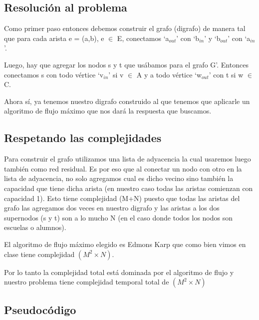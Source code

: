 \subsection{Resolución al problema}

Como primer paso entonces debemos construir el grafo (digrafo) de manera tal que para cada arista e = (a,b), e $\in$ E, conectamos `a$_{out}$' con `b$_{in}$' y `b$_{out}$' con `a$_{in}$'.

Luego, hay que agregar los nodos s y t que usábamos para el grafo G'. Entonces conectamos s con todo vértice `v$_{in}$' si v $\in$ A y a todo vértice `w$_{out}$' con t si w $\in$ C.

Ahora sí, ya tenemos nuestro digrafo construido al que tenemos que aplicarle un algoritmo de flujo máximo que nos dará la respuesta que buscamos.

\subsection{Respetando las complejidades}

Para construir el grafo utilizamos una lista de adyacencia la cual usaremos luego también como red residual. Es por eso que al conectar un nodo con otro en la lista de adyacencia, no solo agregamos cual es dicho vecino sino también la capacidad que tiene dicha arista (en nuestro caso todas las aristas comienzan con capacidad 1). Esto tiene complejidad \bigo(M+N) puesto que todas las aristas del grafo las agregamos dos veces en nuestro digrafo y las aristas a los dos supernodos (s y t) son a lo mucho N (en el caso donde todos los nodos son escuelas o alumnos). 

El algoritmo de flujo máximo elegido es Edmons Karp que como bien vimos en clase tiene complejidad \bigo$(M^2 \times N)$.

Por lo tanto la complejidad total está dominada por el algoritmo de flujo y nuestro problema tiene complejidad temporal total de \bigo$(M^2 \times N)$

\subsection{Pseudocódigo}
	

